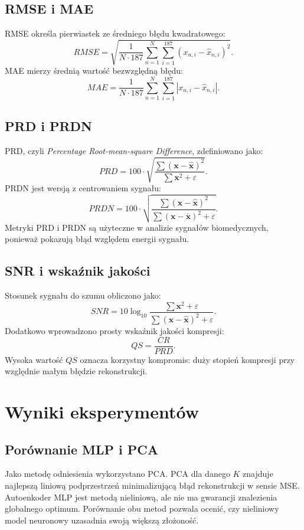 \documentclass[12pt,a4paper]{article}
\begin{document}
\subsection{RMSE i MAE}
RMSE określa pierwiastek ze średniego błędu kwadratowego:
\[
    RMSE = \sqrt{\frac{1}{N \cdot 187}\sum_{n=1}^{N}\sum_{i=1}^{187}
    (x_{n,i}-\hat{x}_{n,i})^2}.
\]
MAE mierzy średnią wartość bezwzględną błędu:
\[
    MAE = \frac{1}{N \cdot 187}\sum_{n=1}^{N}\sum_{i=1}^{187}
    |x_{n,i}-\hat{x}_{n,i}|.
\]

\subsection{PRD i PRDN}
PRD, czyli \textit{Percentage Root-mean-square Difference}, zdefiniowano jako:
\[
    PRD = 100 \cdot
    \sqrt{\frac{\sum(\mathbf{x}-\hat{\mathbf{x}})^2}
    {\sum \mathbf{x}^2+\varepsilon}}.
\]
PRDN jest wersją z centrowaniem sygnału:
\[
    PRDN = 100 \cdot
    \sqrt{\frac{\sum(\mathbf{x}-\hat{\mathbf{x}})^2}
    {\sum(\mathbf{x}-\bar{\mathbf{x}})^2+\varepsilon}}.
\]
Metryki PRD i PRDN są użyteczne w analizie sygnałów biomedycznych, ponieważ pokazują błąd względem energii sygnału.

\subsection{SNR i wskaźnik jakości}
Stosunek sygnału do szumu obliczono jako:
\[
    SNR = 10\log_{10}
    \frac{\sum \mathbf{x}^2+\varepsilon}
    {\sum(\mathbf{x}-\hat{\mathbf{x}})^2+\varepsilon}.
\]
Dodatkowo wprowadzono prosty wskaźnik jakości kompresji:
\[
    QS = \frac{CR}{PRD}.
\]
Wysoka wartość $QS$ oznacza korzystny kompromis: duży stopień kompresji przy względnie małym błędzie rekonstrukcji.

\section{Wyniki eksperymentów}
\subsection{Porównanie MLP i PCA}
Jako metodę odniesienia wykorzystano PCA. PCA dla danego $K$ znajduje najlepszą liniową podprzestrzeń minimalizującą błąd rekonstrukcji w sensie MSE. Autoenkoder MLP jest metodą nieliniową, ale nie ma gwarancji znalezienia globalnego optimum. Porównanie obu metod pozwala ocenić, czy nieliniowy model neuronowy uzasadnia swoją większą złożoność.
\end{document}

